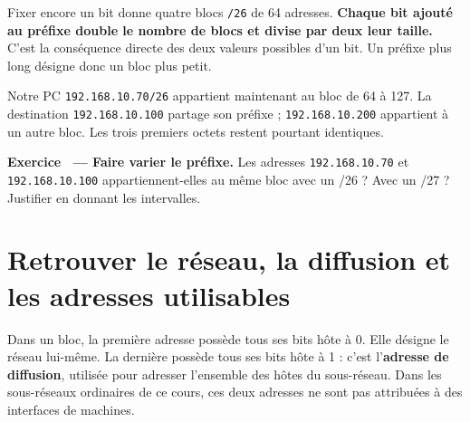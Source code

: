 \documentclass[11pt,a4paper]{article}
\newif\ifcorrige
\newcommand{\ip}[1]{\textcolor{ipred}{\texttt{#1}}}
\newcounter{exo}
\newcommand{\exo}[2]{%
  \Needspace{6cm}\stepcounter{exo}\begin{quest}\textbf{Exercice \theexo\ — #1.} #2\end{quest}}
\newcommand{\zone}[2]{%
  \ifcorrige
    \begin{tcolorbox}[colback=corrbg,colframe=corr,boxrule=0.6pt,arc=1pt,left=5pt,right=5pt,
      fontupper=\small\color{corr}]#2\end{tcolorbox}%
  \else
    \begin{tcolorbox}[colback=white,colframe=black!45,boxrule=0.5pt,arc=1pt,height=#1]\end{tcolorbox}%
  \fi}
\begin{document}
\begin{center}
\end{center}

Fixer encore un bit donne quatre blocs \ip{/26} de 64 adresses. \textbf{Chaque bit ajouté au préfixe
double le nombre de blocs et divise par deux leur taille.} C'est la conséquence directe des deux
valeurs possibles d'un bit. Un préfixe plus long désigne donc un bloc plus petit.

Notre PC \ip{192.168.10.70/26} appartient maintenant au bloc de 64 à 127.
La destination \ip{192.168.10.100} partage son préfixe ; \ip{192.168.10.200} appartient à un autre bloc.
Les trois premiers octets restent pourtant identiques.

\exo{Faire varier le préfixe}{Les adresses \ip{192.168.10.70} et \ip{192.168.10.100}
appartiennent-elles au même bloc avec un /26 ? Avec un /27 ? Justifier en donnant les intervalles.}
\zone{1.8cm}{Avec /26, les deux adresses appartiennent à l'intervalle 64–127.
Avec /27, les blocs ont 32 adresses : 70 appartient à 64–95, et 100 à 96–127.
Elles appartiennent alors à deux sous-réseaux distincts.}

\Needspace{6cm}
\section{Retrouver le réseau, la diffusion et les adresses utilisables}
Dans un bloc, la première adresse possède tous ses bits hôte à 0. Elle désigne le réseau lui-même.
La dernière possède tous ses bits hôte à 1 : c'est l'\textbf{adresse de diffusion}, utilisée pour
adresser l'ensemble des hôtes du sous-réseau. Dans les sous-réseaux ordinaires de ce cours,
ces deux adresses ne sont pas attribuées à des interfaces de machines.
\end{document}
